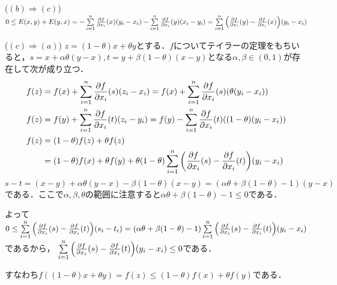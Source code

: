 \documentclass[
		book,
		head_space=20mm,
		foot_space=20mm,
		gutter=10mm,
		line_length=190mm
]{jlreq}
\begin{document}
($(b)\Rightarrow (c)$)
$0\le E(x,y)+E(y,x)=-\sum\limits_{i=1}^{n} \frac{\partial f}{\partial x_i}(x)(y_i-x_i)-\sum\limits_{i=1}^{n} \frac{\partial f}{\partial x_i}(y)(x_i-y_i)=\sum\limits_{i=1}^{n} \qty(\frac{\partial f}{\partial x_i}(y)- \frac{\partial f}{\partial x_i}(x))(y_i-x_i)$

($(c) \Rightarrow (a)$)
$z=(1-\theta)x+\theta y$とする．$f$についてテイラーの定理をもちいると，$s=x+\alpha\theta(y-x),t=y+\beta(1-\theta)(x-y)$となる$\alpha,\beta \in (0,1)$が存在して次が成り立つ．
\begin{align}
    f(z)&=f(x)+\sum\limits_{i=1}^{n} \frac{\partial f}{\partial x_i}(s)(z_i-x_i)= f(x)+\sum\limits_{i=1}^{n} \frac{\partial f}{\partial x_i}(s)(\theta(y_i-x_i))\\
    f(z)&= f(y)+\sum\limits_{i=1}^{n} \frac{\partial f}{\partial x_i}(t)(z_i-y_i)= f(y)-\sum\limits_{i=1}^{n} \frac{\partial f}{\partial x_i}(t)((1-\theta)(y_i-x_i))\\
    f(z)&=(1-\theta)f(z)+\theta f(z)\\
    &=(1-\theta)f(x)+\theta f(y)+\theta(1-\theta)\sum\limits_{i=1}^{n} \qty(\frac{\partial f}{\partial x_i}(s)-\frac{\partial f}{\partial x_i}(t))(y_i-x_i)
\end{align}
$s-t=(x-y)+\alpha\theta(y-x)-\beta(1-\theta)(x-y)=(\alpha\theta+\beta(1-\theta)-1)(y-x)$である．ここで$\alpha,\beta,\theta$の範囲に注意すると$\alpha\theta+\beta(1-\theta)-1\le0$である．

よって$0\le \sum\limits_{i=1}^{n} \qty(\frac{\partial f}{\partial x_i}(s)-\frac{\partial f}{\partial x_i}(t))(s_i-t_i)=(\alpha\theta+\beta(1-\theta)-1)\sum\limits_{i=1}^{n} \qty(\frac{\partial f}{\partial x_i}(s)-\frac{\partial f}{\partial x_i}(t))(y_i-x_i)$であるから，
$\sum\limits_{i=1}^{n} \qty(\frac{\partial f}{\partial x_i}(s)-\frac{\partial f}{\partial x_i}(t))(y_i-x_i)\le 0$である．

すなわち$f((1-\theta)x+\theta y)=f(z)\le (1-\theta)f(x)+\theta f(y)$である．
\end{document}
